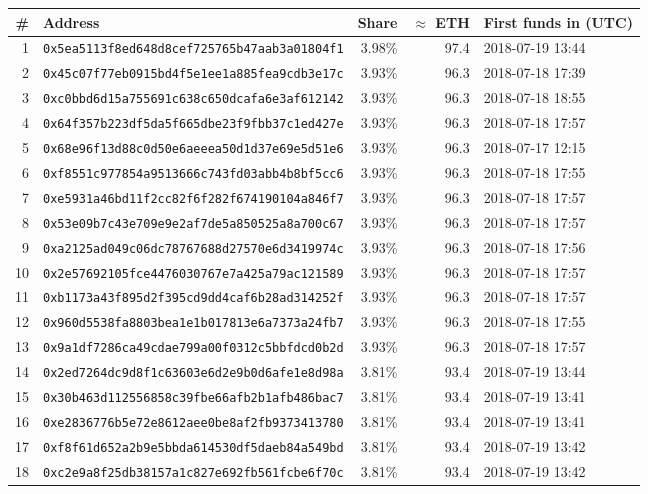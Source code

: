 {\scriptsize\begin{longtable}{r p{7.4cm} r r p{2.6cm}}\toprule
\textbf{\#} & \textbf{Address} & \textbf{Share} & \textbf{$\approx$ ETH} & \textbf{First funds in (UTC)}\\\midrule\endhead
1 & \texttt{0x5ea5113f8ed648d8cef725765b47aab3a01804f1} & 3.98\% & 97.4 & 2018-07-19 13:44\\
2 & \texttt{0x45c07f77eb0915bd4f5e1ee1a885fea9cdb3e17c} & 3.93\% & 96.3 & 2018-07-18 17:39\\
3 & \texttt{0xc0bbd6d15a755691c638c650dcafa6e3af612142} & 3.93\% & 96.3 & 2018-07-18 18:55\\
4 & \texttt{0x64f357b223df5da5f665dbe23f9fbb37c1ed427e} & 3.93\% & 96.3 & 2018-07-18 17:57\\
5 & \texttt{0x68e96f13d88c0d50e6aeeea50d1d37e69e5d51e6} & 3.93\% & 96.3 & 2018-07-17 12:15\\
6 & \texttt{0xf8551c977854a9513666c743fd03abb4b8bf5cc6} & 3.93\% & 96.3 & 2018-07-18 17:55\\
7 & \texttt{0xe5931a46bd11f2cc82f6f282f674190104a846f7} & 3.93\% & 96.3 & 2018-07-18 17:57\\
8 & \texttt{0x53e09b7c43e709e9e2af7de5a850525a8a700c67} & 3.93\% & 96.3 & 2018-07-18 17:57\\
9 & \texttt{0xa2125ad049c06dc78767688d27570e6d3419974c} & 3.93\% & 96.3 & 2018-07-18 17:56\\
10 & \texttt{0x2e57692105fce4476030767e7a425a79ac121589} & 3.93\% & 96.3 & 2018-07-18 17:57\\
11 & \texttt{0xb1173a43f895d2f395cd9dd4caf6b28ad314252f} & 3.93\% & 96.3 & 2018-07-18 17:57\\
12 & \texttt{0x960d5538fa8803bea1e1b017813e6a7373a24fb7} & 3.93\% & 96.3 & 2018-07-18 17:55\\
13 & \texttt{0x9a1df7286ca49cdae799a00f0312c5bbfdcd0b2d} & 3.93\% & 96.3 & 2018-07-18 17:57\\
14 & \texttt{0x2ed7264dc9d8f1c63603e6d2e9b0d6afe1e8d98a} & 3.81\% & 93.4 & 2018-07-19 13:44\\
15 & \texttt{0x30b463d112556858c39fbe66afb2b1afb486bac7} & 3.81\% & 93.4 & 2018-07-19 13:41\\
16 & \texttt{0xe2836776b5e72e8612aee0be8af2fb9373413780} & 3.81\% & 93.4 & 2018-07-19 13:41\\
17 & \texttt{0xf8f61d652a2b9e5bbda614530df5daeb84a549bd} & 3.81\% & 93.4 & 2018-07-19 13:42\\
18 & \texttt{0xc2e9a8f25db38157a1c827e692fb561fcbe6f70c} & 3.81\% & 93.4 & 2018-07-19 13:42\\

\end{longtable}}
